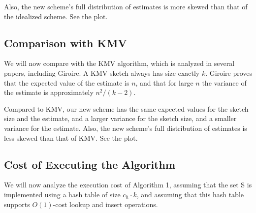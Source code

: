\documentclass{sig-alternate}
\begin{document}

Also, the new scheme's full distribution of estimates is more skewed than that of the idealized scheme.
See the plot.

\subsection{Comparison with KMV}

We will now compare with the KMV algorithm, which is analyzed in
several papers, including Giroire.  A KMV sketch always has size
exactly $k$. Giroire proves that the expected value of the estimate is
$n$, and that for large $n$ the variance of the estimate is
approximately $n^2/(k-2)$.

Compared to KMV, our new scheme has the same expected values for the sketch size and the estimate,
and a larger variance for the sketch size, and a smaller variance for the estimate.
Also, the new scheme's full distribution of estimates is less skewed than that of KMV.
See the plot.




\subsection{Cost of Executing the Algorithm}

We will now analyze the execution cost of Algorithm 1, assuming that the
set S is implemented using a hash table of size $c_h \cdot k$, and
assuming that this hash table supports $O(1)$-cost lookup and insert operations.
\end{document}
